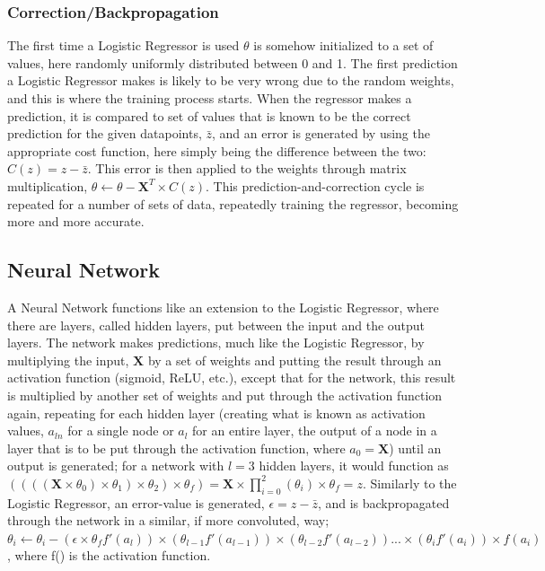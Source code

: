 \documentclass[a4paper, UKenglish]{article}
\newcommand{\0}{\mathbf{0}}
\newcommand{\1}{\mathbf{1}}
\begin{document}
\subsubsection{Correction/Backpropagation}
The first time a Logistic Regressor is used $\theta$ is somehow initialized to a set of values, here randomly uniformly distributed between 0 and 1. The first prediction a Logistic Regressor makes is likely to be very wrong due to the random weights, and this is where the training process starts. When the regressor makes a prediction, it is compared to set of values that is known to be the correct prediction for the given datapoints, $\bar{z}$, and an error is generated by using the appropriate cost function, here simply being the difference between the two: $C(z) = z - \bar{z}$. This error is then applied to the weights through matrix multiplication, $\theta \leftarrow \theta - \textbf{X}^T \times C(z)$. This prediction-and-correction cycle is repeated for a number of sets of data, repeatedly training the regressor, becoming more and more accurate.


\subsection{Neural Network}
A Neural Network functions like an extension to the Logistic Regressor, where there are layers, called hidden layers, put between the input and the output layers. The network makes predictions, much like the Logistic Regressor, by multiplying the input, $\textbf{X}$ by a set of weights and putting the result through an activation function (sigmoid, ReLU, etc.), except that for the network, this result is multiplied by another set of weights and put through the activation function again, repeating for each hidden layer (creating what is known as activation values, $a_{ln}$ for a single node or $a_l$ for an entire layer, the output of a node in a layer that is to be put through the activation function, where $a_0 = \textbf{X}$) until an output is generated; for a network with $l=3$ hidden layers, it would function as $((((\textbf{X}\times \theta_0)\times \theta_1)\times \theta_2)\times \theta_f) = \textbf{X}\times\prod\limits^2_{i=0} (\theta_i) \times \theta_f = z$. Similarly to the Logistic Regressor, an error-value is generated, $\epsilon = z - \bar{z}$, and is backpropagated through the network in a similar, if more convoluted, way; $\theta_i \leftarrow \theta_i - (\epsilon\times\theta_f f'(a_{l})) \times (\theta_{l-1}f'(a_{l-1})) \times (\theta_{l-2}f'(a_{l-2})) ... \times (\theta_if'(a_{i}))\times f(a_i)$, where f() is the activation function.
\end{document}
